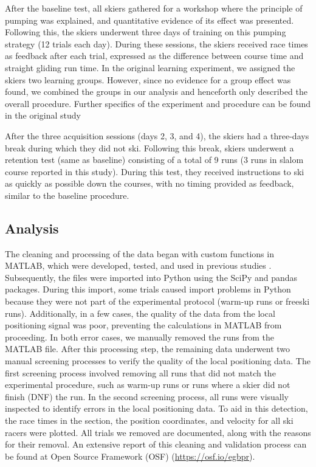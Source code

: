 \documentclass{article}
\begin{document}
After the baseline test, all skiers gathered for a workshop where the principle of pumping was explained, and quantitative evidence of its effect was presented. Following this, the skiers underwent three days of training on this pumping strategy (12 trials each day). During these sessions, the skiers received race times as feedback after each trial, expressed as the difference between course time and straight gliding run time. In the original learning experiment, we assigned the skiers two learning groups. However, since no evidence for a group effect was found, we combined the groups in our analysis and henceforth only described the overall procedure.  Further specifics of the experiment and procedure can be found in the original study \cite{magelssen_is_2022}

After the three acquisition sessions (days 2, 3, and 4), the skiers had a three-days break during which they did not ski. Following this break, skiers underwent a retention test (same as baseline) consisting of a total of 9 runs (3 runs in slalom course reported in this study). During this test, they received instructions to ski as quickly as possible down the courses, with no timing provided as feedback, similar to the baseline procedure.


\subsection{Analysis}
The cleaning and processing of the data began with custom functions in MATLAB, which were developed, tested, and used in previous studies \cite{reid_kinematic_2010}. Subsequently, the files were imported into Python using the SciPy \cite{virtanen_scipy_2020} and pandas \cite{mckinney_pandas-powerful_2015} packages. During this import, some trials caused import problems in Python because they were not part of the experimental protocol (warm-up runs or freeski runs). Additionally, in a few cases, the quality of the data from the local positioning signal was poor, preventing the calculations in MATLAB from proceeding. In both error cases, we manually removed the runs from the MATLAB file. After this processing step, the remaining data underwent two manual screening processes to verify the quality of the local positioning data. The first screening process involved removing all runs that did not match the experimental procedure, such as warm-up runs or runs where a skier did not finish (DNF) the run. In the second screening process, all runs were visually inspected to identify errors in the local positioning data. To aid in this detection, the race times in the section, the position coordinates, and velocity for all ski racers were plotted. All trials we removed are documented, along with the reasons for their removal. An extensive report of this cleaning and validation process can be found at Open Source Framework (OSF)  (\url{https://osf.io/egbpr}).
\end{document}
